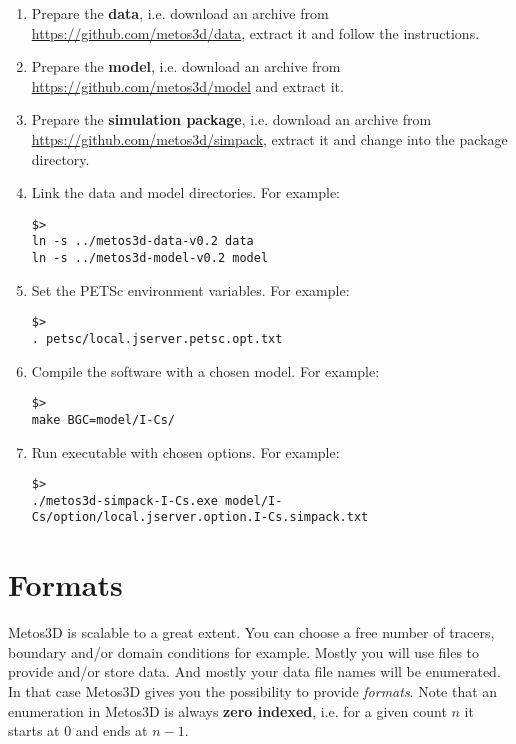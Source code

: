 \documentclass{article}
\begin{document}
\begin{enumerate}
%
\item Prepare the \textbf{data}, i.e. download an archive from \\
		\href{https://github.com/metos3d/data}{https://github.com/metos3d/data},
		extract it and follow the instructions.
%
\item Prepare the \textbf{model}, i.e. download an archive from \\
		\href{https://github.com/metos3d/model}{https://github.com/metos3d/model}
		and extract it.
%
\item Prepare the \textbf{simulation package}, i.e. download an archive from \\
		\href{https://github.com/metos3d/simpack}{https://github.com/metos3d/simpack},
		extract it and change into the package directory.
%
\item Link the data and model directories. For example:
\begin{verbatim}
$>
ln -s ../metos3d-data-v0.2 data
ln -s ../metos3d-model-v0.2 model
\end{verbatim}
%
\item Set the PETSc environment variables. For example:
\begin{verbatim}
$>
. petsc/local.jserver.petsc.opt.txt
\end{verbatim}
%
\item Compile the software with a chosen model. For example:
\begin{verbatim}
$>
make BGC=model/I-Cs/
\end{verbatim}
%
\item Run executable with chosen options. For example:
\begin{verbatim}
$>
./metos3d-simpack-I-Cs.exe model/I-Cs/option/local.jserver.option.I-Cs.simpack.txt
\end{verbatim}
%
\end{enumerate}

%
%
\newpage
\section{Formats}

Metos3D is scalable to a great extent. You can choose a free number of tracers,
boundary and/or domain conditions for example. Mostly you will use files to
provide and/or store data. And mostly your data file names will be
enumerated. In that case Metos3D gives you the possibility to provide \emph{formats}.
Note that
an enumeration in Metos3D is always \textbf{zero indexed},
i.e. for a given count $n$ it starts at $0$ and ends at $n-1$.
\end{document}
